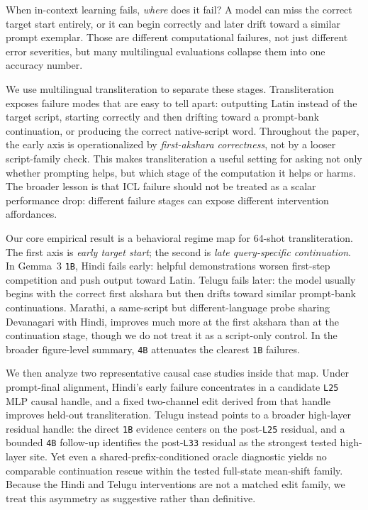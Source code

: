 \documentclass{article}
\begin{document}
When in-context learning fails, \emph{where} does it fail? A model can miss the correct target start entirely, or it can begin correctly and later drift toward a similar prompt exemplar. Those are different computational failures, not just different error severities, but many multilingual evaluations collapse them into one accuracy number.

We use multilingual transliteration to separate these stages. Transliteration exposes failure modes that are easy to tell apart: outputting Latin instead of the target script, starting correctly and then drifting toward a prompt-bank continuation, or producing the correct native-script word. Throughout the paper, the early axis is operationalized by \emph{first-akshara correctness}, not by a looser script-family check. This makes transliteration a useful setting for asking not only whether prompting helps, but which stage of the computation it helps or harms. The broader lesson is that ICL failure should not be treated as a scalar performance drop: different failure stages can expose different intervention affordances.

Our core empirical result is a behavioral regime map for 64-shot transliteration. The first axis is \emph{early target start}; the second is \emph{late query-specific continuation}. In Gemma~3 \texttt{1B}, Hindi fails early: helpful demonstrations worsen first-step competition and push output toward Latin. Telugu fails later: the model usually begins with the correct first akshara but then drifts toward similar prompt-bank continuations. Marathi, a same-script but different-language probe sharing Devanagari with Hindi, improves much more at the first akshara than at the continuation stage, though we do not treat it as a script-only control. In the broader figure-level summary, \texttt{4B} attenuates the clearest \texttt{1B} failures.

We then analyze two representative causal case studies inside that map. Under prompt-final alignment, Hindi's early failure concentrates in a candidate \texttt{L25} MLP causal handle, and a fixed two-channel edit derived from that handle improves held-out transliteration. Telugu instead points to a broader high-layer residual handle: the direct \texttt{1B} evidence centers on the post-\texttt{L25} residual, and a bounded \texttt{4B} follow-up identifies the post-\texttt{L33} residual as the strongest tested high-layer site. Yet even a shared-prefix-conditioned oracle diagnostic yields no comparable continuation rescue within the tested full-state mean-shift family. Because the Hindi and Telugu interventions are not a matched edit family, we treat this asymmetry as suggestive rather than definitive.
\end{document}
